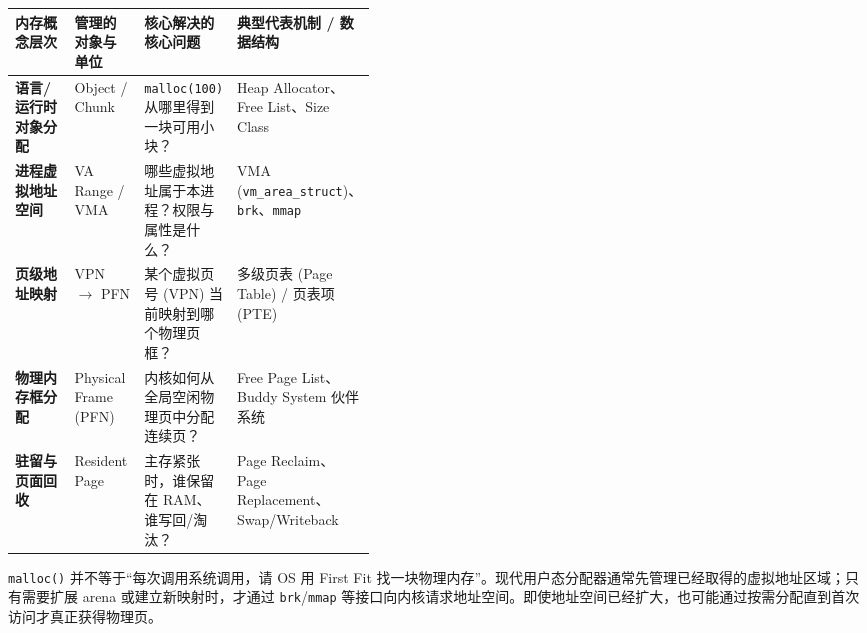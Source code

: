 \documentclass[11pt,a4paper]{ctexart}
\newcommand{\code}[1]{\texttt{#1}}
\begin{document}
\begin{center}

\begingroup
\small
\renewcommand{\arraystretch}{1.25}
\setlength{\tabcolsep}{6pt}
\begin{tabularx}{\linewidth}{>{\bfseries}p{0.22\linewidth} p{0.2\linewidth} X X}
\toprule
内存概念层次 & 管理的对象与单位 & 核心解决的核心问题 & 典型代表机制 / 数据结构\\
\midrule
语言/运行时对象分配 & Object / Chunk & \code{malloc(100)} 从哪里得到一块可用小块？ & Heap Allocator、Free List、Size Class\\
进程虚拟地址空间 & VA Range / VMA & 哪些虚拟地址属于本进程？权限与属性是什么？ & VMA (\code{vm\_area\_struct})、\code{brk}、\code{mmap}\\
页级地址映射 & VPN $\rightarrow$ PFN & 某个虚拟页号 (VPN) 当前映射到哪个物理页框？ & 多级页表 (Page Table) / 页表项 (PTE)\\
物理内存框分配 & Physical Frame (PFN) & 内核如何从全局空闲物理页中分配连续页？ & Free Page List、Buddy System 伙伴系统\\
驻留与页面回收 & Resident Page & 主存紧张时，谁保留在 RAM、谁写回/淘汰？ & Page Reclaim、Page Replacement、Swap/Writeback\\
\bottomrule
\end{tabularx}
\endgroup
\end{center}

\begin{warn}[最容易形成的错误模型]
\code{malloc()} 并不等于“每次调用系统调用，请 OS 用 First Fit 找一块物理内存”。现代用户态分配器通常先管理已经取得的虚拟地址区域；只有需要扩展 arena 或建立新映射时，才通过 \code{brk}/\code{mmap} 等接口向内核请求地址空间。即使地址空间已经扩大，也可能通过按需分配直到首次访问才真正获得物理页。
\end{warn}
\end{document}
